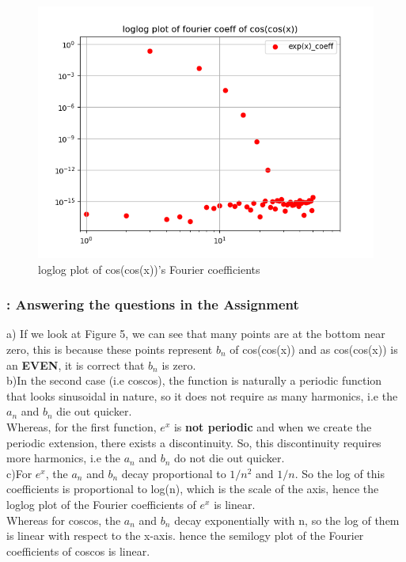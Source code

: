 \documentclass[11pt]{article}
\begin{document}
\begin{figure}[H]
    \centering
    \includegraphics[scale = 0.5]{Figure_6.png}
    \caption{loglog plot of cos(cos(x))'s Fourier coefficients}
\end{figure}

\subsubsection{: Answering the questions in the Assignment}
a) If we look at Figure 5, we can see that many points are at the bottom near zero, this is because these points represent $b_n$  of cos(cos(x)) and as cos(cos(x)) is an \textbf{EVEN}, it is correct that $b_n$ is zero.\\

\noindent b)In the second case (i.e coscos), the function is naturally a periodic function that looks sinusoidal in nature, so it does not require as many harmonics, i.e the $a_n$ and $b_n$ die out quicker.\\
Whereas, for the first function, $e^{x}$ is \textbf{not periodic} and when we create the periodic extension, there exists a discontinuity. So, this discontinuity requires more harmonics, i.e the $a_n$ and $b_n$ do not die out quicker.\\

\noindent c)For $e^{x}$, the $a_n$ and $b_n$ decay proportional to $1/n^2$ and $1/n$. So the log of this coefficients is proportional to log(n), which is the scale of the axis, hence the loglog plot of the Fourier coefficients of $e^{x}$ is linear.\\
Whereas for coscos, the $a_n$ and $b_n$ decay exponentially with n, so the log of them is linear with respect to the x-axis. hence the semilogy plot of the Fourier coefficients of coscos is linear.
\end{document}
